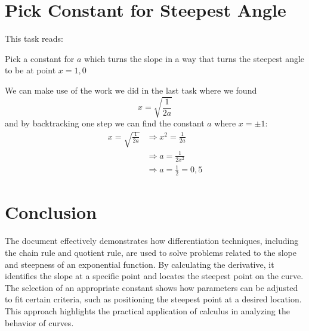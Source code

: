 \documentclass[a4paper,12pt]{article}
\begin{document}
\section{Pick Constant for Steepest Angle}
\label{sec:uppgN}
This task reads:\\ %
\begin{addmargin}[1em]{1em}
    Pick a constant for $a$ which turns the slope in a way that %
    turns the steepest angle to be at point $x = 1,0$
\end{addmargin}
We can make use of the work we did in the last task where we found
\begin{displaymath}
    x = \sqrt{\frac{1}{2a}} %
\end{displaymath}
and by backtracking one step we can find the constant $a$ where $x = \pm 1$:
\begin{equation}
    \begin{split} %
        x = \sqrt{\frac{1}{2a}} &\Rightarrow x^2 = \frac{1}{2a} \\%
                                &\Rightarrow a = \frac{1}{2x^2} \\%
                                &\Rightarrow a = \frac{1}{2} = 0,5
    \end{split}
\end{equation}
\section{Conclusion}
\label{sec:disk}
The document effectively demonstrates how differentiation techniques, 
including the chain rule and quotient rule, are used to solve problems 
related to the slope and steepness of an exponential function. 
By calculating the derivative, it identifies the slope 
at a specific point and locates the steepest point on the curve. 
The selection of an appropriate constant shows how parameters can be 
adjusted to fit certain criteria, such as positioning the steepest 
point at a desired location. This approach highlights the practical 
application of calculus in analyzing the behavior of curves.
\end{document}
